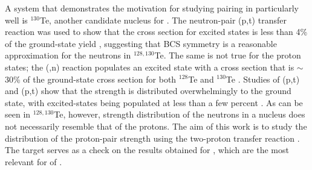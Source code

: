A system that demonstrates the motivation for studying pairing in  particularly well is $^{130}$Te, another candidate nucleus for \zvbb.  The neutron-pair (p,t) transfer reaction was used to show that the cross section for excited \zp states is less than 4\% of the ground-state yield \citep{neutronPairsTellurium}, suggesting that BCS symmetry is a reasonable approximation for the neutrons in $^{128,130}$Te.  The same is not true for the proton states; the (,n) reaction populates an excited \zp state with a cross section that is $\sim$30\% of the ground-state cross section for both $^{128}$Te and $^{130}$Te \citep{protonPairsTellurium}.  Studies of (p,t) and (p,t) show that the \zp strength is distributed overwhelmingly to the ground state, with excited-\zp states being populated at less than a few percent \citep{neutronPairsGermanium}.  As can be seen in $^{128,130}$Te, however, \zp strength distribution of the neutrons in a nucleus does not necessarily resemble that of the protons.  The aim of this work is to study the distribution of the proton-pair strength using the two-proton transfer reaction \reaction.  The  target serves as a check on the results obtained for , which are the most relevant for \zvbb of . 

